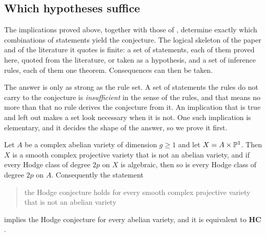 \subsection{Which hypotheses suffice}
\label{ssec:closure}

The implications proved above, together with those of ,
determine exactly which combinations of statements yield the conjecture. The
logical skeleton of the paper and of the literature it quotes is finite: a
set of statements, each of them proved here, quoted from the literature, or
taken as a hypothesis, and a set of inference rules, each of them one
theorem. Consequences can then be taken.

The answer is only as strong as the rule set. A set of statements the rules
do not carry to the conjecture is \emph{insufficient} in the sense of the
rules, and that means no more than that no rule derives the conjecture from
it. An implication that is true and left out makes a set look necessary when
it is not. One such implication
is elementary, and it decides the shape of the answer, so we prove it first.

\begin{proposition}\label{prop:f3ishc}
Let $A$ be a complex abelian variety of dimension $g\ge1$ and let
$X=A\times\mathbb{P}^{1}$. Then $X$ is a smooth complex projective variety that is
not an abelian variety, and if every Hodge class of degree $2p$ on $X$ is
algebraic, then so is every Hodge class of degree $2p$ on $A$. Consequently
the statement
\begin{quote}
the Hodge conjecture holds for every smooth complex projective variety that
is not an abelian variety
\end{quote}
implies the Hodge conjecture for every abelian variety, and it is equivalent
to $\mathbf{HC}$.
\end{proposition}

